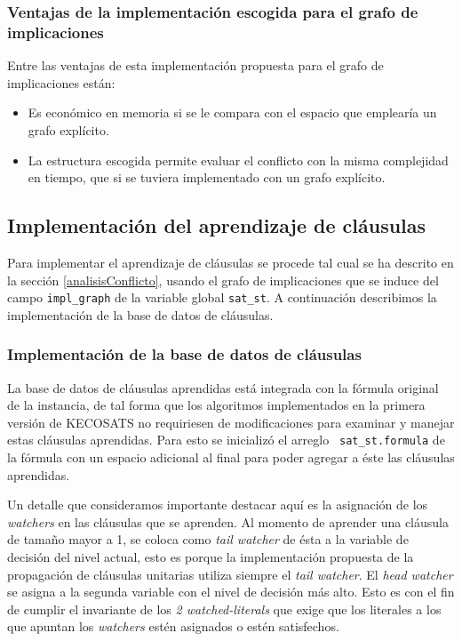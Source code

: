 \documentclass[12pt,lettersize,oneside]{article}
\begin{document}
\subsubsection{Ventajas de la implementación escogida para el grafo de
  implicaciones}
Entre las ventajas de esta implementación propuesta para el grafo de
implicaciones están: \vspace{-2.5mm}

\begin{itemize}
\item Es económico en memoria si se le compara con el espacio que emplearía un
  grafo explícito.  
\item La estructura escogida permite evaluar el conflicto con la misma
  complejidad en tiempo, que si se tuviera implementado con un grafo explícito.
\end{itemize}

\subsection{Implementación del aprendizaje de cláusulas}
Para implementar el aprendizaje de cláusulas se procede tal cual se ha descrito
en la sección \ref{analisisConflicto}, usando el grafo de implicaciones que se
induce del campo {\tt impl\_graph} de la variable global {\tt sat\_st}. A
continuación describimos la implementación de la base de datos de cláusulas.

\subsubsection{Implementación de la base de datos de cláusulas}
La base de datos de cláusulas aprendidas está integrada con la fórmula original
de la instancia, de tal forma que los algoritmos implementados en la primera
versión de KECOSATS no requiriesen de modificaciones para examinar y manejar
estas cláusulas aprendidas. Para esto se inicializó el arreglo {\tt
  sat\_st.formula} de la fórmula con un espacio adicional al final para poder
agregar a éste las cláusulas aprendidas. 

Un detalle que consideramos importante destacar aquí es la asignación de los
\emph{watchers} en las cláusulas que se aprenden. Al momento de aprender una
cláusula de tamaño mayor a 1, se coloca como \emph{tail watcher} de ésta a la
variable de decisión del nivel actual, esto es porque la implementación
propuesta de la propagación de cláusulas unitarias utiliza siempre el \emph{tail
  watcher}. El \emph{head watcher} se asigna a la segunda variable con el nivel
de decisión más alto. Esto es con el fin de cumplir el invariante de los \emph{2
  watched-literals} que exige que los literales a los que apuntan los
\emph{watchers} estén asignados o estén satisfechos.
\end{document}
